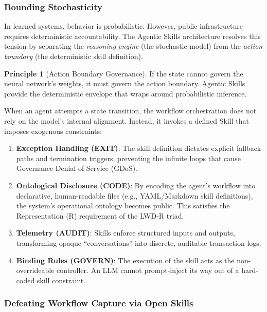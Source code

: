 \documentclass[11pt,a4paper]{article}
\theoremstyle{definition}
\newtheorem{principle}{Principle}[section]
\begin{document}
\subsubsection{Bounding Stochasticity}

In learned systems, behavior is probabilistic. However, public infrastructure requires deterministic accountability. The Agentic Skills architecture resolves this tension by separating the \textit{reasoning engine} (the stochastic model) from the \textit{action boundary} (the deterministic skill definition).

\begin{principle}[Action Boundary Governance]
If the state cannot govern the neural network's weights, it must govern the action boundary. Agentic Skills provide the deterministic envelope that wraps around probabilistic inference.
\end{principle}

When an agent attempts a state transition, the workflow orchestration does not rely on the model's internal alignment. Instead, it invokes a defined Skill that imposes exogenous constraints:

\begin{enumerate}[noitemsep]
    \item \textbf{Exception Handling (EXIT)}: The skill definition dictates explicit fallback paths and termination triggers, preventing the infinite loops that cause Governance Denial of Service (GDoS).
    \item \textbf{Ontological Disclosure (CODE)}: By encoding the agent's workflow into declarative, human-readable files (e.g., YAML/Markdown skill definitions), the system's operational ontology becomes public. This satisfies the Representation (R) requirement of the LWD-R triad.
    \item \textbf{Telemetry (AUDIT)}: Skills enforce structured inputs and outputs, transforming opaque ``conversations'' into discrete, auditable transaction logs.
    \item \textbf{Binding Rules (GOVERN)}: The execution of the skill acts as the non-overrideable controller. An LLM cannot prompt-inject its way out of a hard-coded skill constraint.
\end{enumerate}

\subsubsection{Defeating Workflow Capture via Open Skills}
\end{document}
